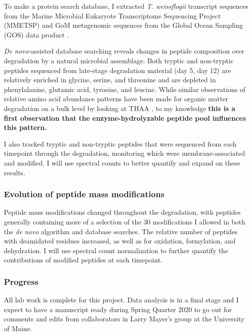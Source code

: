 \documentclass[12pt, letterpaper, twoside]{article}
\begin{document}
To make a protein search database, I extracted \textit{T. weissflogii} transcript sequences from the Marine Microbial Eukaryote Transcriptome Sequencing Project (MMETSP) \cite{keeling_marine_2014} and GoM metagenomic sequences from the Global Ocean Sampling (GOS) data product \cite{yooseph_sorcerer_2007}.
 
\textit{De novo}-assisted database searching reveals changes in peptide composition over degradation by a natural microbial assemblage. Both tryptic and non-tryptic peptides sequenced from late-stage degradation material (day 5, day 12) are relatively enriched in glycine, serine, and threonine and are depleted in phenylalanine, glutamic acid, tyrosine, and leucine. While similar observations of relative amino acid abundance patterns have been made for organic matter degradation on a bulk level by looking at THAA \cite{dauwe_linking_1999}, to my knowledge \textbf{this is a first observation that the enzyme-hydrolyzable peptide pool influences this pattern.} 

I also tracked tryptic and non-tryptic peptides that were sequenced from each timepoint through the degradation, monitoring which were membrane-associated and modified. I will use spectral counts to better quantify and expand on these results. 

\subsubsection{Evolution of peptide mass modifications}

Peptide mass modifications changed throughout the degradation, with peptides generally containing more of a selection of the 30 modifications I allowed in both the \textit{de novo} algorithm and database searches. The relative number of peptides with deamidated residues increased, as well as for oxidation, formylation, and dehydration. I will use spectral count normalization to further quantify the contributions of modified peptides at each timepoint. 

\subsubsection*{Progress}

All lab work is complete for this project. Data analysis is in a final stage and I expect to have a manuscript ready during Spring Quarter 2020 to go out for comments and edits from collaborators in Larry Mayer's group at the University of Maine.
\end{document}
